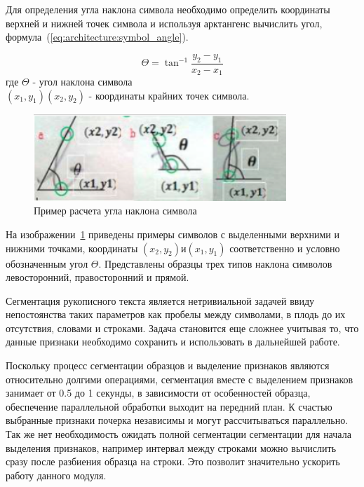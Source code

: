 Для определения угла наклона символа необходимо определить координаты верхней и нижней точек символа и используя арктангенс вычислить угол, формула~(\ref{eq:architecture:symbol_angle}).

\begin{equation}
  \label{eq:architecture:symbol_angle}
  \Theta = \tan^{-1}{\frac{y_2 - y_1}{x_2 - x_1}}
\end{equation}
где  $\Theta$ - угол наклона символа \\
     $ (x_1, y_1) (x_2, y_2) $  - координаты крайних точек символа.


\begin{figure}[ht]
    \centering
    \includegraphics[width=0.85\textwidth]{figures/char_angle.png}
    \caption{Пример расчета угла наклона символа}
    \label{fig:architecture:symbol_angle}
\end{figure}

На изображении~\ref{fig:architecture:symbol_angle} приведены примеры символов с выделенными верхними и нижними точками, координаты $ (x_2, y_2) и (x_1, y_1) $ соответственно и условно обозначенным угол $ \Theta $. Представлены образцы трех типов наклона символов левосторонний, правосторонний и прямой.

Сегментация рукописного текста является нетривиальной задачей ввиду непостоянства таких параметров как пробелы между символами, в плодь до их отсутствия, словами и строками. Задача становится еще сложнее учитывая то, что данные признаки необходимо сохранить и использовать в дальнейшей работе.

Поскольку процесс сегментации образцов и выделение признаков являются относительно долгими операциями, сегментация вместе с выделением признаков занимает от 0.5 до 1 секунды, в зависимости от особенностей образца, обеспечение параллельной обработки выходит на передний план. К счастью выбранные признаки почерка независимы и могут рассчитываться параллельно. Так же нет необходимость ожидать полной сегментации сегментации для начала выделения признаков, например интервал между строками можно вычислить сразу после разбиения образца на строки. Это позволит значительно ускорить работу данного модуля.

